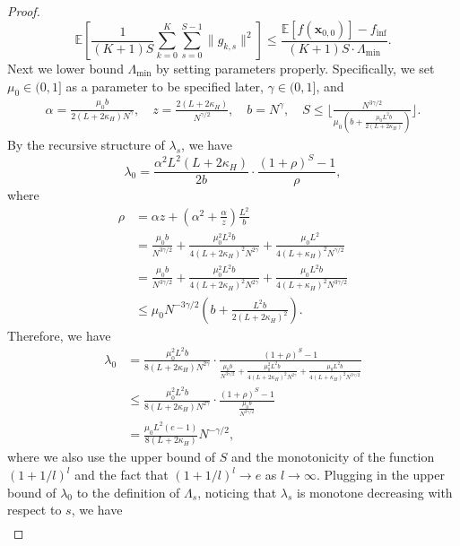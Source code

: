\documentclass[10pt,a4paper]{amsart}
\newcommand{\bx}{\boldsymbol{x}}
\begin{document}
\begin{proof}
\begin{equation}
     \mathbb{E}\left[\frac{1}{(K+1)S}\sum_{k=0}^K\sum_{s=0}^{S-1}\|g_{k,s}\|^2\right] \leq \frac{\mathbb{E}[f(\bx_{0,0})] - f_{\inf}}{(K+1)S \cdot \Lambda_{\min}}.
\end{equation}
Next we lower bound $\Lambda_{\min}$ by setting parameters properly. Specifically, we set $\mu_0\in(0,1]$ as a parameter to be specified later, $\gamma\in(0,1]$, and
\begin{align*}
    \alpha = \frac{\mu_0 b}{2(L+2\kappa_H)N^\gamma},\quad z = \frac{2(L+2\kappa_H)}{N^{\gamma/2}}, \quad b = N^{\gamma},\quad S \leq \bigg\lfloor\frac{N^{3\gamma/2}}{\mu_0(b+\frac{\mu_0L^2b}{2(L+2\kappa_H)})}\bigg\rfloor.
\end{align*}
By the recursive structure of $\lambda_s$, we have
\begin{equation*}
    \lambda_0=\frac{\alpha^2 L^2(L+2\kappa_H)}{2b}\cdot \frac{(1+\rho)^S-1}{\rho},
\end{equation*}
where
\begin{align*}
    \rho & = \alpha z + \left(\alpha^2 + \frac{\alpha}{ z}\right)\frac{ L^2}{b} \\
    & = \frac{\mu_0 b}{N^{3\gamma/2}} + \frac{\mu_0^2L^2 b}{4(L+2\kappa_H)^2N^{2\gamma}}+\frac{\mu_0L^2}{4(L+\kappa_H)^2N^{\gamma/2}}\\
    & = \frac{\mu_0 b}{N^{3\gamma/2}} + \frac{\mu_0^2L^2 b}{4(L+2\kappa_H)^2N^{2\gamma}}+\frac{\mu_0L^2b}{4(L+\kappa_H)^2N^{3\gamma/2}} \\
    & \leq \mu_0 N^{-3\gamma/2} \left( b + \frac{L^2b}{2(L+2\kappa_H)^2}\right).
\end{align*}
Therefore, we have
\begin{align*}
    \lambda_0 & =  \frac{\mu_0^2 L^2 b}{8(L+2\kappa_H)N^{2\gamma}} \cdot \frac{(1+\rho)^S-1}{\frac{\mu_0 b}{N^{3\gamma/2}} + \frac{\mu_0^2L^2 b}{4(L+2\kappa_H)^2N^{2\gamma}}+\frac{\mu_0L^2b}{4(L+\kappa_H)^2N^{3\gamma/2}}}\\
    & \leq \frac{\mu_0^2 L^2 b}{8(L+2\kappa_H)N^{2\gamma}} \cdot \frac{(1+\rho)^S-1}{\frac{\mu_0 b}{N^{3\gamma/2}}}\\
    & = \frac{\mu_0 L^2(e-1)}{8(L+2\kappa_H) }N^{-\gamma/2},
\end{align*}
where we also use the upper bound of $S$ and the monotonicity of the function $(1+1/l)^l$ and the fact that $(1+1/l)^l\rightarrow e$ as $l\rightarrow\infty$.
Plugging in the upper bound of $\lambda_0$ to the definition of $\Lambda_s$, noticing that $\lambda_s$ is monotone decreasing with respect to $s$, we have
\begin{align*}

\end{align*}
\end{proof}
\end{document}
